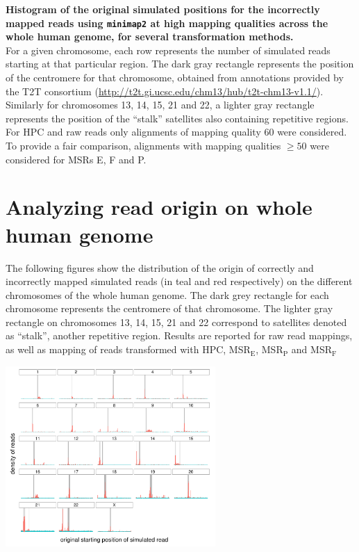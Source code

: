 \documentclass[
  11,
]{scrbook}
\begin{document}
\textbf{Histogram of the original simulated positions for the incorrectly
mapped reads using \texttt{minimap2} at high mapping qualities across the whole
human genome, for several transformation methods.}\\
For a given chromosome, each row represents the number of simulated
reads starting at that particular region. The dark gray rectangle
represents the position of the centromere for that chromosome, obtained
from annotations provided by the T2T consortium
(\url{http://t2t.gi.ucsc.edu/chm13/hub/t2t-chm13-v1.1/}). Similarly for
chromosomes 13, 14, 15, 21 and 22, a lighter gray rectangle represents
the position of the ``stalk'' satellites also containing repetitive
regions. For HPC and raw reads only alignments of mapping quality 60
were considered. To provide a fair comparison, alignments with mapping
qualities \(\geq 50\) were considered for MSRs E, F and P.

\hypertarget{appendix:all-reads-hist}{%
\section{Analyzing read origin on whole human genome}\label{appendix:all-reads-hist}}

The following figures show the distribution of the origin of correctly
and incorrectly mapped simulated reads (in teal and red respectively) on
the different chromosomes of the whole human genome. The dark grey
rectangle for each chromosome represents the centromere of that
chromosome. The lighter gray rectangle on chromosomes 13, 14, 15, 21 and
22 correspond to satellites denoted as ``stalk'', another repetitive
region. Results are reported for raw read mappings, as well as mapping
of reads transformed with HPC, MSR\(_{\text{E}}\), MSR\(_{\text{P}}\) and
MSR\(_{\text{F}}\)

\begin{center}
\includegraphics[width=0.6\textwidth]{./figures/HPC-MSRs/raw_distrib.centro.rstart.pdf}  
\end{center}
\end{document}
